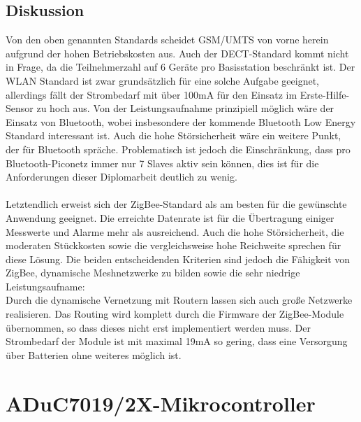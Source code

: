     \subsection{Diskussion}
        Von den oben genannten Standards scheidet GSM/UMTS von vorne herein aufgrund der hohen Betriebskosten aus.
        Auch der DECT-Standard kommt nicht in Frage, da die Teilnehmerzahl auf 6 Geräte pro Basisstation beschränkt ist.
        Der WLAN Standard ist zwar grundsätzlich für eine solche Aufgabe geeignet, allerdings fällt der Strombedarf mit
        über 100mA für den Einsatz im Erste-Hilfe-Sensor zu hoch aus. Von der Leistungsaufnahme prinzipiell möglich wäre
        der Einsatz von Bluetooth, wobei insbesondere der kommende Bluetooth Low Energy Standard interessant ist. Auch die
        hohe Störsicherheit wäre ein weitere Punkt, der für Bluetooth spräche. Problematisch ist jedoch die Einschränkung,
        dass pro Bluetooth-Piconetz immer nur 7 Slaves aktiv sein können, dies ist für die Anforderungen dieser Diplomarbeit
        deutlich zu wenig.\\
        \\
        Letztendlich erweist sich der ZigBee-Standard als am besten für die gewünschte Anwendung geeignet. Die erreichte
        Datenrate ist für die Übertragung einiger Messwerte und Alarme mehr als ausreichend. Auch die hohe Störsicherheit,
        die moderaten Stückkosten sowie die vergleichsweise hohe Reichweite sprechen für diese Lösung. 
        Die beiden entscheidenden Kriterien sind jedoch die Fähigkeit von ZigBee, dynamische Meshnetzwerke zu bilden sowie
        die sehr niedrige Leistungsaufname:\\
        Durch die dynamische Vernetzung mit Routern lassen sich auch große Netzwerke realisieren. Das Routing wird komplett
        durch die Firmware der ZigBee-Module übernommen, so dass dieses nicht erst implementiert werden muss. Der Strombedarf
        der Module ist mit maximal 19mA so gering, dass eine Versorgung über Batterien ohne weiteres möglich ist.

\section{ADuC7019/2X-Mikrocontroller}


